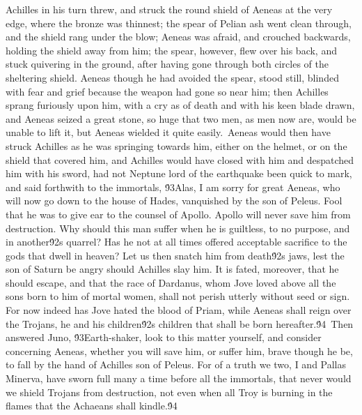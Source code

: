 {Achilles in his turn threw, and struck the round shield of Aeneas at the very edge, where the bronze was thinnest; the spear of Pelian ash went clean through, and the shield rang under the blow; Aeneas was afraid, and crouched backwards, holding the shield away from him; the spear, however, flew over his back, and stuck quivering in the ground, after having gone through both circles of the sheltering shield. Aeneas though he had avoided the spear, stood still, blinded with fear and grief because the weapon had gone so near him; then Achilles sprang furiously upon him, with a cry as of death and with his keen blade drawn, and Aeneas seized a great stone, so huge that two men, as men now are, would be unable to lift it, but Aeneas wielded it quite easily.\
Aeneas would then have struck Achilles as he was springing towards him, either on the helmet, or on the shield that covered him, and Achilles would have closed with him and despatched him with his sword, had not Neptune lord of the earthquake been quick to mark, and said forthwith to the immortals, \'93Alas, I am sorry for great Aeneas, who will now go down to the house of Hades, vanquished by the son of Peleus. Fool that he was to give ear to the counsel of Apollo. Apollo will never save him from destruction. Why should this man suffer when he is guiltless, to no purpose, and in another\'92s quarrel? Has he not at all times offered acceptable sacrifice to the gods that dwell in heaven? Let us then snatch him from death\'92s jaws, lest the son of Saturn be angry should Achilles slay him. It is fated, moreover, that he should escape, and that the race of Dardanus, whom Jove loved above all the sons born to him of mortal women, shall not perish utterly without seed or sign. For now indeed has Jove hated the blood of Priam, while Aeneas shall reign over the Trojans, he and his children\'92s children that shall be born hereafter.\'94\
Then answered Juno, \'93Earth-shaker, look to this matter yourself, and consider concerning Aeneas, whether you will save him, or suffer him, brave though he be, to fall by the hand of Achilles son of Peleus. For of a truth we two, I and Pallas Minerva, have sworn full many a time before all the immortals, that never would we shield Trojans from destruction, not even when all Troy is burning in the flames that the Achaeans shall kindle.\'94\
}
